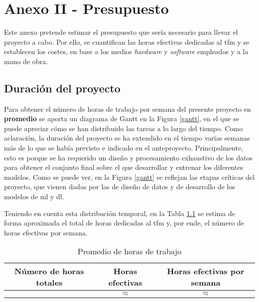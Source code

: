 \chapter{Anexo II - Presupuesto}

Este anexo pretende estimar el presupuesto que sería necesario para llevar el proyecto a cabo. Por ello, se cuantifican las horas efectivas dedicadas al \gls{tfm} y se establecen los costes, en base a los medios \textit{hardware} y \textit{software} empleados y a la mano de obra.

\section{Duración del proyecto}

Para obtener el número de horas de trabajo por semana del presente proyecto en \textbf{promedio} se aporta un diagrama de Gantt en la Figura \ref{gantt}, en el que se puede apreciar cómo se han distribuido las tareas a lo largo del tiempo. Como aclaración, la duración del proyecto se ha extendido en el tiempo varias semanas más de lo que se había previsto e indicado en el anteproyecto. Principalmente, esto es porque se ha requerido un diseño y procesamiento exhaustivo de los datos para obtener el conjunto final sobre el que desarrollar y entrenar los diferentes modelos. Como se puede ver, en la Figura \ref{gantt} se reflejan las etapas críticas del proyecto, que vienen dadas por las de diseño de datos y de desarrollo de los modelos de \gls{ml} y \gls{dl}. 

\vspace{3mm}

Teniendo en cuenta esta distribución temporal, en la Tabla \ref{dig:horasTrabajadas} se estima de forma aproximada el total de horas dedicadas al \gls{tfm} y, por ende, el número de horas efectivas por semana.

\vspace{3mm}

\begin{table}[ht!]
    \centering
    \begin{tabular}{|c|c|c|}
    \hline
    \rowcolor[HTML]{EFEFEF}
    \textbf{Número de horas totales} & \textbf{Horas efectivas} & \textbf{Horas efectivas por semana} \\ \hline
                                & $\approx$    & $\approx$                        \\ \hline
    \end{tabular}
    \caption{Promedio de horas de trabajo }
    \label{dig:horasTrabajadas}
\end{table}

